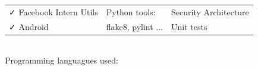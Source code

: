 \documentclass[letterpaper]{jm-cv} %
\begin{document}
{\begin{tabular}{ l l l }
    {\color{mainblue}\faCheck} Facebook Intern Utils &
    \hspace{1cm}{\color{maingreen}\faCheck} Python tools:&
    \hspace{1cm}{\color{maingray}\faCheck} Security Architecture\\

    {\color{mainblue}\faCheck} Android &
    \hspace{1.5cm}flake8, pylint ...&
    \hspace{1cm}{\color{maingray}\faCheck} Unit tests \\

  \end{tabular}\\

  Programming languagues used:\\
}

\medskip
\divider
\medskip

\end{document}
